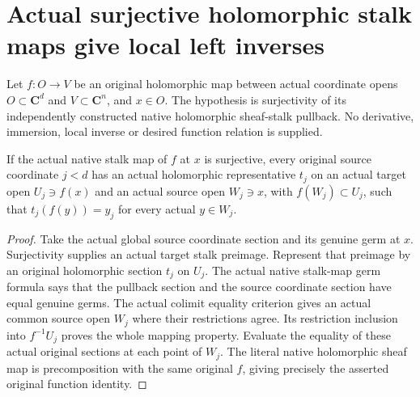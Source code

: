 \section{Actual surjective holomorphic stalk maps give local left inverses}

Let $f:O\to V$ be an original holomorphic map between actual coordinate
opens $O\subset\mathbf C^d$ and $V\subset\mathbf C^n$, and $x\in O$.
The hypothesis is surjectivity of its independently constructed native
holomorphic sheaf-stalk pullback. No derivative, immersion, local inverse
or desired function relation is supplied.

\begin{theorem}
\label{hir:actual-holomorphic-stalk-surjection-coordinate-lifts}
\leanok
If the actual native stalk map of $f$ at $x$ is surjective, every original
source coordinate $j<d$ has an actual holomorphic representative $t_j$ on
an actual target open $U_j\ni f(x)$ and an actual source open $W_j\ni x$,
with $f(W_j)\subset U_j$, such that
$t_j(f(y))=y_j$ for every actual $y\in W_j$.
\end{theorem}
\begin{proof}
Take the actual global source coordinate section and its genuine germ at
$x$. Surjectivity supplies an actual target stalk preimage. Represent that
preimage by an original holomorphic section $t_j$ on $U_j$. The actual native
stalk-map germ formula says that the pullback section and the source coordinate
section have equal genuine germs. The actual colimit equality criterion gives
an actual common source open $W_j$ where their restrictions agree. Its
restriction inclusion into $f^{-1}U_j$ proves the whole mapping property.
Evaluate the equality of these actual original sections at each point of
$W_j$. The literal native holomorphic sheaf map is precomposition with the
same original $f$, giving precisely the asserted original function identity.
\end{proof}

